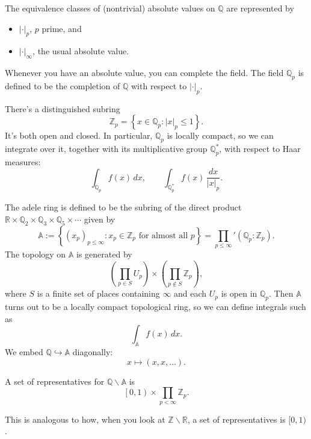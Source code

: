 \documentclass[reqno]{amsart} 
\begin{document}
\begin{theorem}[Ostrowski]
  The equivalence classes of (nontrivial) absolute values on $\mathbb{Q}$ are represented by
  \begin{itemize}
  \item $\lvert \cdot \rvert_p$, $p$ prime, and
  \item $\lvert \cdot \rvert_\infty$, the usual absolute value.
  \end{itemize}
\end{theorem}

Whenever you have an absolute value, you can complete the field.  The field $\mathbb{Q}_p$ is defined to be the completion of $\mathbb{Q}$ with respect to $\lvert \cdot \rvert_p$.

There's a distinguished subring
\begin{equation*}
  \mathbb{Z}_p = \left\{ x \in \mathbb{Q}_p : \lvert x \rvert_p \leq 1 \right\}.
\end{equation*}
It's both open and closed.  In particular, $\mathbb{Q}_p$ is locally compact, so we can integrate over it, together with its multiplicative group $\mathbb{Q}_p^\ast$, with respect to Haar measures:
\begin{equation*}
  \int_{\mathbb{Q}_p} f(x) \, d x,
  \qquad
  \int_{\mathbb{Q}_p^\ast} f(x)
  \, \frac{d x}{\lvert x \rvert_p}.
\end{equation*}

The adele ring is defined to be the subring of the direct product $\mathbb{R} \times \mathbb{Q}_2 \times \mathbb{Q}_3 \times \mathbb{Q}_5 \times \dotsb$ given by
\begin{equation*}
  \mathbb{A} := \left\{(x_p)_{p \leq \infty} : x_p \in \mathbb{Z}_p  \text{ for almost all }
    p \right\}
  =
  \prod_{p \leq \infty}'
  (\mathbb{Q}_p : \mathbb{Z}_p).
\end{equation*}
The topology on $\mathbb{A}$ is generated by
\begin{equation*}
  \left( \prod_{p \in S} U_p \right)
  \times \left( \prod_{p \notin S} \mathbb{Z}_p \right),
\end{equation*}
where $S$ is a finite set of places containing $\infty$ and each $U_p$ is open in $\mathbb{Q}_p$.  Then $\mathbb{A}$ turns out to be a locally compact topological ring, so we can define integrals such as
\begin{equation*}
  \int_{\mathbb{A}} f(x) \, d x.
\end{equation*}
We embed $\mathbb{Q} \hookrightarrow \mathbb{A}$ diagonally:
\begin{equation*}
  x \mapsto(x, x, \dotsc).
\end{equation*}
\begin{lemma}
  A set of representatives for $\mathbb{Q} \backslash \mathbb{A}$ is
  \begin{equation*}
    \left[0,1\right) \times \prod_{p < \infty} \mathbb{Z}_p.
  \end{equation*}
\end{lemma}
This is analogous to how, when you look at $\mathbb{Z} \backslash \mathbb{R}$, a set of representatives is $[0,1)$.
\end{document}
